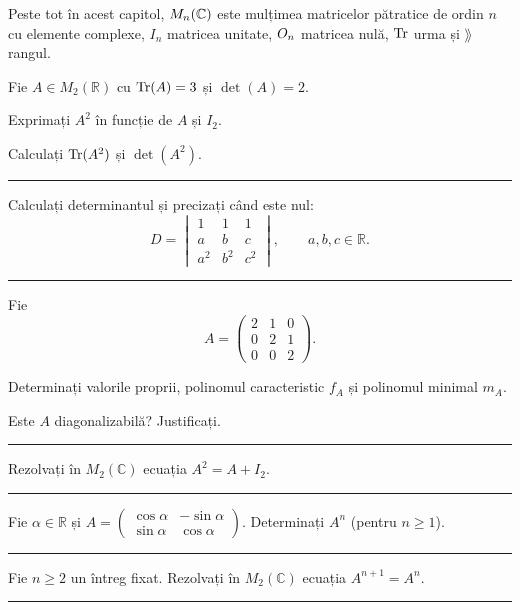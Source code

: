 
{\small Peste tot în acest capitol, $M_n(\mathbb{C})$ este mulțimea matricelor pătratice de ordin $n$ cu elemente complexe,
$I_n$ matricea unitate, $O_n$ matricea nulă, $\operatorname{Tr}$ urma și $\rang$ rangul.}

Fie $A\in M_2(\mathbb{R})$ cu $\operatorname{Tr}(A)=3$ și $\det(A)=2$.
\begin{parti}
  \item Exprimați $A^2$ în funcție de $A$ și $I_2$.
  \item Calculați $\operatorname{Tr}(A^2)$ și $\det(A^2)$.
\end{parti}
\vspace{1mm}\hrule

Calculați determinantul și precizați când este nul:
\[ D=\begin{vmatrix} 1&1&1\\ a&b&c\\ a^2&b^2&c^2 \end{vmatrix},\qquad a,b,c\in\mathbb{R}. \]
\vspace{1mm}\hrule

Fie
\[ A=\begin{pmatrix} 2&1&0\\ 0&2&1\\ 0&0&2 \end{pmatrix}. \]
\begin{parti}
  \item Determinați valorile proprii, polinomul caracteristic $f_A$ și polinomul minimal $m_A$.
  \item Este $A$ diagonalizabilă? Justificați.
\end{parti}
\vspace{1mm}\hrule

Rezolvați în $M_2(\mathbb{C})$ ecuația $A^2=A+I_2$.
\vspace{1mm}\hrule

Fie $\alpha\in\mathbb{R}$ și $A=\begin{pmatrix}\cos\alpha & -\sin\alpha\\ \sin\alpha & \cos\alpha\end{pmatrix}$. Determinați $A^n$ (pentru $n\ge1$).
\vspace{1mm}\hrule

Fie $n\ge2$ un întreg fixat. Rezolvați în $M_2(\mathbb{C})$ ecuația $A^{n+1}=A^n$.
\vspace{1mm}\hrule

